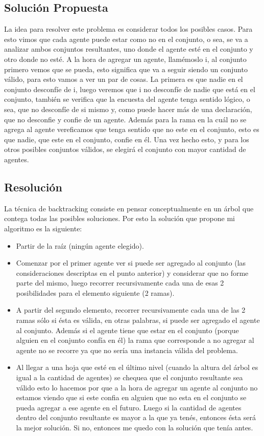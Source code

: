\subsection{Solución Propuesta}

	La idea para resolver este problema es considerar todos los posibles casos. Para esto vimos que cada agente puede estar como no en el conjunto, o sea, se va a analizar ambos conjuntos resultantes, uno donde el agente esté en el conjunto y otro donde no esté. A la hora de agregar un agente, llamémoslo i, al conjunto primero vemos que se pueda, esto significa que va a seguir siendo un conjunto válido, para esto vamos a ver un par de cosas. La primera es que nadie en el conjunto desconfíe de i, luego veremos que i no desconfíe de nadie que está en el conjunto, también se verifica que la encuesta del agente tenga sentido lógico, o sea, que no desconfíe de si mismo y, como puede hacer más de una declaración, que no desconfie y confie de un agente. Además para la rama en la cuál no se agrega al agente vereficamos que tenga sentido que no este en el conjunto, esto es que nadie, que este en el conjunto, confie en él. Una vez hecho esto, y  para los otros posibles conjuntos válidos, se elegirá el conjunto con mayor cantidad de agentes. 
	
\subsection{Resolución}
	La técnica de backtracking consiste en pensar conceptualmente en un árbol que contega todas las posibles soluciones. Por esto la solución que propone mi algoritmo es la siguiente:
	
\begin{itemize}
\setlength\itemsep{-0.2em}
\item Partir de la raíz (ningún agente elegido).
\item Comenzar por el primer agente ver si puede ser agregado al conjunto (las consideraciones descriptas en el punto anterior) y considerar que no forme parte del mismo, luego recorrer recursivamente cada una de esas 2 posibilidades para el elemento siguiente (2 ramas).
\item A partir del segundo elemento, recorrer recursivamente cada una de las 2 ramas sólo si ésta es válida, en otras palabras, si puede ser agregado el agente al conjunto. Además si el agente tiene que estar en el conjunto (porque alguien en el conjunto confía en él) la rama que corresponde a no agregar al agente no se recorre ya que no sería una instancia válida del problema.
\item Al llegar a una hoja que esté en el último nivel (cuando la altura del árbol es igual a la cantidad de agentes) se chequea que el conjunto resultante sea válido esto lo hacemos por que a la hora de agregar un agente al conjunto no estamos viendo que si este confia en alguien que no esta en el conjunto se pueda agregar a ese agente en el futuro. Luego si la cantidad de agentes dentro del conjunto resultante es mayor a la que ya tenés, entonces ésta será la mejor solución. Si no, entonces me quedo con la solución que tenía antes.
\end{itemize}
	
